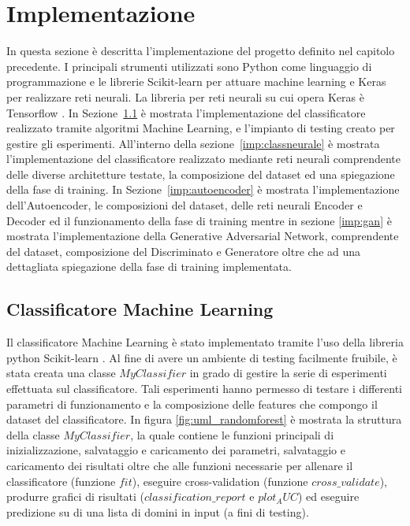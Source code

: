\chapter{Implementazione}
\label{implementazione}
In questa sezione è descritta l'implementazione del progetto definito nel capitolo precedente. I principali strumenti utilizzati sono Python come linguaggio di programmazione e le librerie Scikit-learn \cite{sklearn} per attuare machine learning e Keras \cite{keras} per realizzare reti neurali. La libreria per reti neurali su cui opera Keras è Tensorflow \cite{tensorflow}.
In Sezione~\ref{imp:randomforest} è mostrata l'implementazione del classificatore realizzato tramite algoritmi Machine Learning, e l'impianto di testing creato per gestire gli esperimenti. All'interno della sezione~\ref{imp:classneurale} è mostrata l'implementazione del classificatore realizzato mediante reti neurali comprendente delle diverse architetture testate, la composizione del dataset ed una spiegazione della fase di training. 
In Sezione~\ref{imp:autoencoder} è mostrata l'implementazione dell'Autoencoder, le composizioni del dataset, delle reti neurali Encoder e Decoder ed il funzionamento della fase di training mentre in sezione \ref{imp:gan} è mostrata l'implementazione della Generative Adversarial Network, comprendente del dataset, composizione del Discriminato e Generatore oltre che ad una dettagliata spiegazione della fase di training implementata.

\newpage
\section{Classificatore Machine Learning}
\label{imp:randomforest}
Il classificatore Machine Learning è stato implementato tramite l'uso della libreria python Scikit-learn \cite{sklearn}. 
Al fine di avere un ambiente di testing facilmente fruibile, è stata creata una classe $MyClassifier$ in grado di gestire la serie di esperimenti effettuata sul classificatore. Tali esperimenti hanno permesso di testare i differenti parametri di funzionamento e la composizione delle features che compongo il dataset del classificatore. In figura \ref{fig:uml_randomforest} è mostrata la struttura della classe $MyClassifier$, la quale contiene le funzioni principali di inizializzazione, salvataggio e caricamento dei parametri, salvataggio e caricamento dei risultati oltre che alle funzioni necessarie per allenare il classificatore (funzione $fit$), eseguire cross-validation (funzione $cross\_validate$), produrre grafici di risultati ($classification\_report$ e $plot_AUC$) ed eseguire predizione su di una lista di domini in input (a fini di testing).

